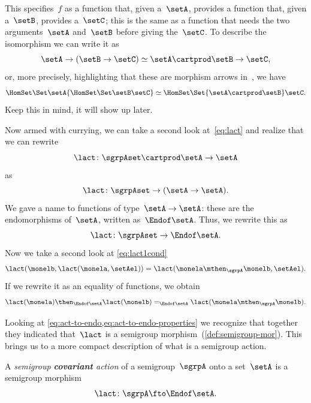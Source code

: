 This specifies~$f$ as a function that, given a~$\setA$, provides a function that, given a~$\setB$, provides a~$\setC$;
this is the same as a function that needs the two arguments~$\setA$ and~$\setB$ before giving the~$\setC$.
To describe the isomorphism we can write it as
\begin{equation}\label{eq:currying-iso-1}
  \setA \to ( \setB \to \setC) \simeq  \setA \cartprod \setB \to \setC,
\end{equation}
or, more precisely, highlighting that these are morphism arrows in~\Set, we have
\begin{equation}\label{eq:currying-iso-2}
  \HomSet\Set\setA{\HomSet\Set\setB\setC} \simeq \HomSet\Set{\setA \cartprod \setB}\setC.
\end{equation}
Keep this in mind, it will show up later.

Now armed with currying, we can take a second look at~\cref{eq:lact} and realize that we can rewrite
\begin{equation}\label{eq:currying-lact-1}
\lact \colon \sgrpAset \cartprod \setA \to \setA
\end{equation}
as
\begin{equation}\label{eq:currying-lact-2}
  \lact \colon \sgrpAset \to (\setA \to \setA).
\end{equation}
We gave a name to functions of type~$\setA \to \setA$: these are the endomorphisms of~$\setA$, written as~$\Endof\setA$.
Thus, we rewrite this as
\begin{equation}\label{eq:act-to-endo}
  \lact \colon \sgrpAset \to \Endof\setA.
\end{equation}
Now we take a second look at \cref{eq:lact1cond}
\begin{equation}\label{eq:lact1cond-2}
  \lact(\monelb, \lact(\monela, \setAel)) = \lact(\monela \mthen_\sgrpA \monelb, \setAel).
\end{equation}
If we rewrite it as an equality of functions, we obtain
\begin{equation} \label{eq:act-to-endo-properties}
  \lact(\monela) \then_{\Endof\setA}  \lact(\monelb) =_{\Endof\setA} \lact(\monela \mthen_\sgrpA \monelb).
\end{equation}

Looking at \cref{eq:act-to-endo,eq:act-to-endo-properties} we recognize that together
they indicated that~$\lact$ is a semigroup morphism~(\cref{def:semigroup-mor}). This brings us to a more compact description of what is a semigroup action.

\begin{ctdefinition}\label{def:semigroup-cov-action}
  A \emph{semigroup \textbf{covariant} action} of a semigroup~$\sgrpA$ onto a set~$\setA$ is a semigroup morphism
  \begin{equation}\label{eq:act-semigroup}
    \lact \colon \sgrpA \fto \Endof\setA.
  \end{equation}
\end{ctdefinition}

